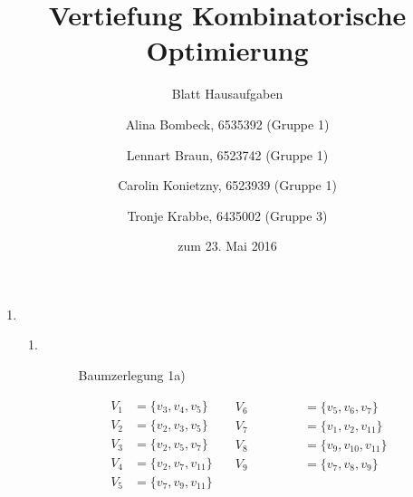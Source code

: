 \documentclass[a4paper]{scrartcl}
\title{Vertiefung Kombinatorische Optimierung}
\subtitle{Blatt {\blattnr} Hausaufgaben}
\author{%
    Alina Bombeck, 6535392 (Gruppe 1) \and
    Lennart Braun, 6523742 (Gruppe 1) \and
    Carolin Konietzny, 6523939 (Gruppe 1) \and
    Tronje Krabbe, 6435002 (Gruppe 3)
}
\date{zum 23. Mai 2016}
\begin{document}
\maketitle


\begin{enumerate}[label=\bfseries \arabic*.]
\item %
\begin{enumerate}
    \item %
        \hfill \\
        \begin{figure}[H]
        \centering
        \caption{Baumzerlegung 1a)}
        \end{figure}

        \begin{equation*}
            \begin{aligned}
                V_1 &= \{v_3, v_4, v_5 \} \\
                V_2 &= \{v_2, v_3, v_5 \} \\
                V_3 &= \{v_2, v_5, v_7\} \\
                V_4 &= \{v_2, v_7, v_{11}\} \\
                V_5 &= \{v_7, v_9, v_{11}\}
            \end{aligned}
            \quad
            \begin{aligned}
                V_6 &= \{v_5, v_6, v_7\} \\
                V_7 &= \{v_1, v_2, v_{11}\} \\
                V_8 &= \{v_9, v_{10}, v_{11}\} \\
                V_9 &= \{v_7, v_8, v_9\} \\
                \phantom{irgendwas}
            \end{aligned}
        \end{equation*}
        

\end{enumerate}
\end{enumerate}
\end{document}

